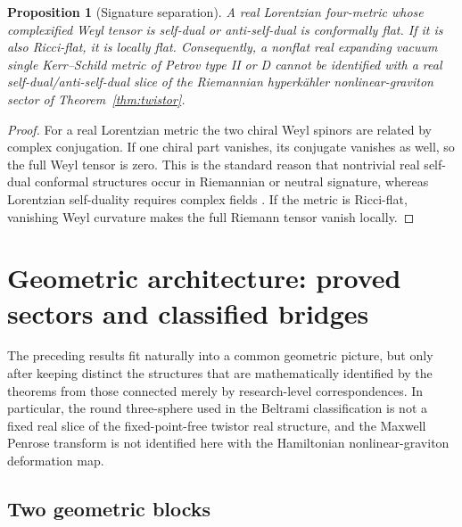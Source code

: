 \documentclass[aps,prd,reprint,nofootinbib,superscriptaddress]{revtex4-2}
\newtheorem{proposition}[theorem]{Proposition}
\theoremstyle{definition}
\theoremstyle{remark}
\begin{document}
\begin{proposition}[Signature separation]
\label{prop:signatureseparation}
A real Lorentzian four-metric whose complexified Weyl tensor is self-dual or anti-self-dual is conformally flat.  If it is also Ricci-flat, it is locally flat.  Consequently, a nonflat real expanding vacuum single Kerr--Schild metric of Petrov type II or D cannot be identified with a real self-dual/anti-self-dual slice of the Riemannian hyperk\"ahler nonlinear-graviton sector of Theorem~\ref{thm:twistor}.
\end{proposition}
\begin{proof}
For a real Lorentzian metric the two chiral Weyl spinors are related by complex conjugation.  If one chiral part vanishes, its conjugate vanishes as well, so the full Weyl tensor is zero.  This is the standard reason that nontrivial real self-dual conformal structures occur in Riemannian or neutral signature, whereas Lorentzian self-duality requires complex fields \cite{AtiyahDunajskiMason2017}.  If the metric is Ricci-flat, vanishing Weyl curvature makes the full Riemann tensor vanish locally.
\end{proof}

\section{Geometric architecture: proved sectors and classified bridges}
\label{sec:interpretation}

The preceding results fit naturally into a common geometric picture, but only after keeping distinct the structures that are mathematically identified by the theorems from those connected merely by research-level correspondences.  In particular, the round three-sphere used in the Beltrami classification is not a fixed real slice of the fixed-point-free twistor real structure, and the Maxwell Penrose transform is not identified here with the Hamiltonian nonlinear-graviton deformation map.

\subsection{Two geometric blocks}
\end{document}
